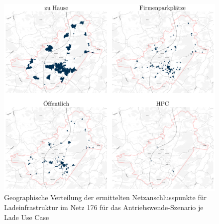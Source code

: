 \begin{figure}[H]
    \centering
    \includegraphics[width=\textwidth]{Bilder/cps_in_grid_176}
    \caption{Geographische Verteilung der ermittelten Netzanschlusspunkte für Ladeinfrastruktur im Netz \num{176} für das Antriebswende-Szenario je Lade Use Case}\label{fig:cps_in_grid}
\end{figure}